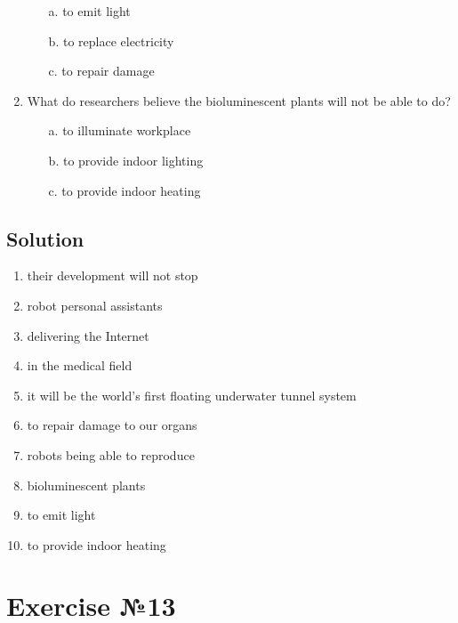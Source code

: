 \begin{enumerate}
            \begin{enumerate}
                  \item[a.] to emit light
                  \item[b.] to replace electricity
                  \item[c.] to repair damage
            \end{enumerate}
      \item What do researchers believe the bioluminescent plants will not be able to do?
            \begin{enumerate}
                  \item[a.] to illuminate workplace
                  \item[b.] to provide indoor lighting
                  \item[c.] to provide indoor heating
            \end{enumerate}
\end{enumerate}

\subsection*{Solution}
\begin{enumerate}
      \item their development will not stop
      \item robot personal assistants
      \item delivering the Internet
      \item in the medical field
      \item it will be the world's first floating underwater tunnel system
      \item to repair damage to our organs
      \item robots being able to reproduce
      \item bioluminescent plants
      \item to emit light
      \item to provide indoor heating
\end{enumerate}

\section{Exercise №13}
